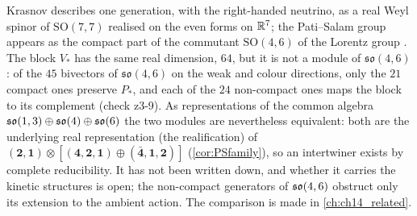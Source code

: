 \begin{remark}
\label{rem:krasnovpointer}
Krasnov describes one generation, with the right-handed neutrino, as a real Weyl spinor of $\mathrm{SO}(7,7)$ realised on the even forms
on $\mathbb{R}^7$; the Pati--Salam group appears as the compact part of the commutant $\mathrm{SO}(4,6)$ of the Lorentz group \cite{Krasnov18}.
The block $V_*$ has the same real dimension, $64$, but it is not a module of $\mathfrak{so}(4,6)$: of the $45$ bivectors of
$\mathfrak{so}(4,6)$ on the weak and colour directions, only the $21$ compact ones preserve $P_*$, and each of the $24$ non-compact ones
maps the block to its complement (check z3-9). As representations of the common algebra $\mathfrak{so}(1,3)\oplus\mathfrak{so}(4)\oplus\mathfrak{so}(6)$ the two modules are
nevertheless equivalent: both are the underlying real representation (the realification) of $(\mathbf2,\mathbf1)\otimes[(\mathbf4,\mathbf2,\mathbf1)\oplus(\bar{\mathbf4},\mathbf1,\mathbf2)]$ (\cref{cor:PSfamily}),
so an intertwiner exists by complete reducibility. It has not been written down, and whether it carries the kinetic structures is open; the
non-compact generators of $\mathfrak{so}(4,6)$ obstruct only its extension to the ambient action. The comparison is made in \cref{ch:ch14_related}.
\end{remark}

